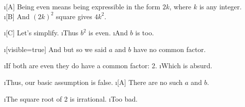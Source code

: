 \i[A] Being even means being expressible in the form $2k$, where $k$ is
any integer.
\i[B] And $(2k)^2$ square gives $4k^2$.

\i[C] Let's simplify.
\i Thus $b^2$ is even.
\i And $b$ is too.

\endslide





\i[visible=true] And but so we said $a$ and $b$ have no common factor.

\i If both are even they do have a common factor: 2.
\i Which is absurd.

\i Thus, our basic assumption is false.
\i[A] There are no such $a$ and $b$.

\i The square root of 2 is irrational.
\i Too bad.

\endslide



\bye



